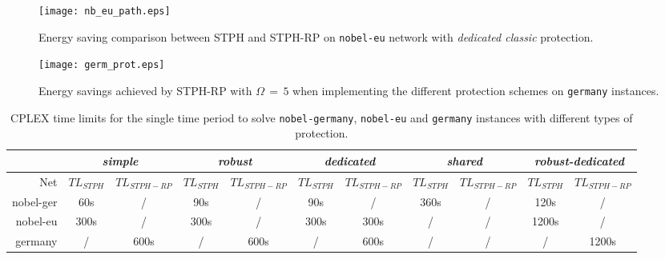 \documentclass[final,5p,times,twocolumn]{elsarticle}
\begin{document}
\begin{figure}[t]\centering
  \texttt{[image: nb\_eu\_path.eps]}
  \caption{Energy saving comparison between STPH and STPH-RP on {\tt nobel-eu} network with \textit{dedicated classic} protection.}
\label{fig:STPH_vs_STPH-RP}
\end{figure}

\begin{figure*}[t]\centering
  \texttt{[image: germ\_prot.eps]}
  \caption{Energy savings achieved by STPH-RP with $\Omega\,=\,5$ when implementing the different protection schemes on {\tt germany} instances.}
\label{fig:germany_general}
\end{figure*}

\begin{table*}[!ht]\footnotesize
\tabcolsep 6pt
\caption{CPLEX time limits for the single time period to solve {\tt nobel-germany}, {\tt nobel-eu} and {\tt germany} instances with different types of protection.}
\begin{center}
\begin{tabular}{rcccccccccc}
& \multicolumn{2}{c}{\textit{simple}} & \multicolumn{2}{c}{\textit{robust}} & \multicolumn{2}{c}{\textit{dedicated}} & \multicolumn{2}{c}{\textit{shared}} & \multicolumn{2}{c}{\textit{robust-dedicated}} \\
\hline
Net & $TL_{STPH}$ & $TL_{STPH-RP}$ & $TL_{STPH}$ & $TL_{STPH-RP}$ & $TL_{STPH}$ & $TL_{STPH-RP}$ & $TL_{STPH}$ & $TL_{STPH-RP}$ & $TL_{STPH}$ & $TL_{STPH-RP}$ \\
\hline

nobel-ger	& 60s   & /    & 90s  & /    &  90s  & /    & 360s & /    & 120s  & /     \\
nobel-eu	& 300s  & /    & 300s & /    &  300s & 300s & /    & /    & 1200s & /     \\
germany  	& /     & 600s & /    & 600s &  /    & 600s & /    & /    & /     & 1200s \\
                                                                       
\hline 
\end{tabular}
\end{center}
\label{tab:time_limit}
\end{table*}
\end{document}
